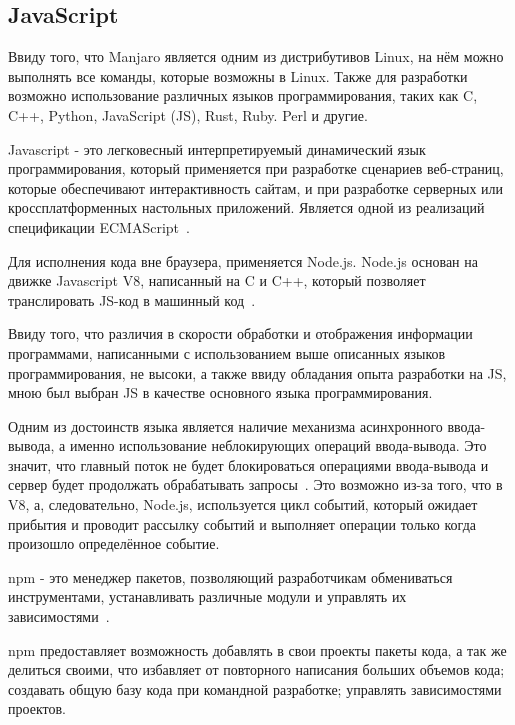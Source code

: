 \subsection{JavaScript}

Ввиду того, что Manjaro является одним из дистрибутивов Linux, на нём можно выполнять все команды, которые возможны в Linux. Также для разработки возможно использование различных языков программирования, таких как C, C++, Python, JavaScript (JS), Rust, Ruby. Perl и другие. 

Javascript - это легковесный интерпретируемый динамический язык программирования, который применяется при разработке сценариев веб-страниц, которые обеспечивают интерактивность сайтам, и при разработке серверных или кроссплатформенных настольных приложений. Является одной из реализаций спецификации ECMAScript~\cite{JS}.

Для исполнения кода вне браузера, применяется Node.js. Node.js основан на движке Javascript V8, написанный на C и C++, который позволяет транслировать JS-код в машинный код~\cite{node}.

Ввиду того, что различия в скорости обработки и отображения информации программами, написанными с использованием выше описанных языков программирования, не высоки, а также ввиду обладания опыта разработки на JS, мною был выбран JS в качестве основного языка программирования.

Одним из достоинств языка является наличие механизма асинхронного ввода-вывода, а именно использование неблокирующих операций ввода-вывода. Это значит, что главный поток не будет блокироваться операциями ввода-вывода и сервер будет продолжать обрабатывать запросы~\cite{node}. Это возможно из-за того, что в V8, а, следовательно, Node.js, используется цикл событий, который ожидает прибытия и проводит рассылку событий и выполняет операции только когда произошло определённое событие.

npm - это менеджер пакетов, позволяющий разработчикам обмениваться инструментами, устанавливать различные модули и управлять их зависимостями~\cite{npm}.

npm предоставляет возможность добавлять в свои проекты пакеты кода, а так же делиться своими, что избавляет от повторного написания больших объемов кода; создавать общую базу кода при командной разработке; управлять зависимостями проектов.
